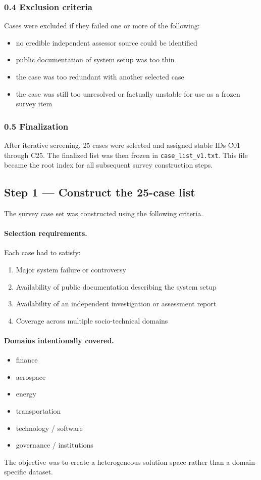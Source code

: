 \subsubsection*{0.4 Exclusion criteria}
Cases were excluded if they failed one or more of the following:
\begin{itemize}
  \item no credible independent assessor source could be identified
  \item public documentation of system setup was too thin
  \item the case was too redundant with another selected case
  \item the case was still too unresolved or factually unstable for use as a frozen survey item
\end{itemize}

\subsubsection*{0.5 Finalization}
After iterative screening, 25 cases were selected and assigned stable IDs C01 through C25. The finalized list was then
frozen in \texttt{case\_list\_v1.txt}. This file became the root index for all subsequent survey construction steps.

\subsection*{Step 1 --- Construct the 25-case list}
The survey case set was constructed using the following criteria.

\paragraph{Selection requirements.}
Each case had to satisfy:
\begin{enumerate}
  \item Major system failure or controversy
  \item Availability of public documentation describing the system setup
  \item Availability of an independent investigation or assessment report
  \item Coverage across multiple socio-technical domains
\end{enumerate}

\paragraph{Domains intentionally covered.}
\begin{itemize}
  \item finance
  \item aerospace
  \item energy
  \item transportation
  \item technology / software
  \item governance / institutions
\end{itemize}
The objective was to create a heterogeneous solution space rather than a domain-specific dataset.

